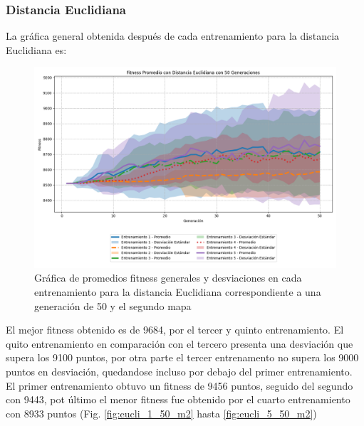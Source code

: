 \documentclass[conference]{IEEEtran}
\begin{document}
\subsubsection{Distancia Euclidiana}
La gráfica general obtenida después de cada entrenamiento para la distancia Euclidiana es:
\begin{figure}[H]
    \centering
    \includegraphics[width=0.9\linewidth]{Euclidiana/Mapa2/Fitness_Prrm_Map2_Eucli_50Gen.png}
    \caption{Gráfica de promedios fitness generales y desviaciones en cada entrenamiento para la distancia Euclidiana correspondiente a una generación de 50 y el segundo mapa}
    \label{fig:eucli_mapa2}
\end{figure}
El mejor fitness obtenido es de 9684, por el tercer y quinto entrenamiento. El quito entrenamiento en comparación con el tercero presenta una desviación que supera los 9100 puntos, por otra parte el tercer entrenamento no supera los 9000 puntos en desviación, quedandose incluso por debajo del primer entrenamiento. El primer entrenamiento obtuvo un fitness de 9456 puntos, seguido del segundo con 9443, pot último el menor fitness fue obtenido por el cuarto entrenamiento con 8933 puntos (Fig. \ref{fig:eucli_1_50_m2} hasta \ref{fig:eucli_5_50_m2})
\end{document}
